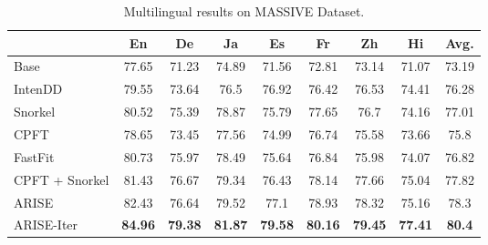 \begin{table*}[!h]
\centering
\begin{tabular}{|l|c|c|c|c|c|c|c|c|}
\hline
           & \textbf{En}                  & \textbf{De}                  & \textbf{Ja}                  & \textbf{Es}                  & \textbf{Fr}                  & \textbf{Zh}                  & \textbf{Hi}                  & \textbf{Avg.} \\ \hline
Base       & 77.65                        & 71.23                        & 74.89                        & 71.56                        & 72.81                        & 73.14                        & 71.07                        & 73.19            \\ \hline
IntenDD    & 79.55                        & {\color[HTML]{565869} 73.64} & {\color[HTML]{565869} 76.5}  & {\color[HTML]{565869} 76.92} & {\color[HTML]{565869} 76.42} & {\color[HTML]{565869} 76.53} & {\color[HTML]{565869} 74.41} & 76.28            \\ \hline
Snorkel    & {\color[HTML]{565869} 80.52} & {\color[HTML]{565869} 75.39} & {\color[HTML]{565869} 78.87} & {\color[HTML]{565869} 75.79} & {\color[HTML]{565869} 77.65} & {\color[HTML]{565869} 76.7}  & {\color[HTML]{565869} 74.16} & 77.01            \\ \hline
CPFT     & 78.65                        & {\color[HTML]{565869} 73.45} & {\color[HTML]{565869} 77.56} & {\color[HTML]{565869} 74.99} & {\color[HTML]{565869} 76.74} & {\color[HTML]{565869} 75.58} & {\color[HTML]{565869} 73.66} & 75.8             \\ \hline
FastFit    & 80.73                        & 75.97                        & 78.49                        & 75.64                        & 76.84                        & 75.98                        & 74.07                        & 76.82            \\ \hline
CPFT + Snorkel    & 81.43 &	76.67	&79.34&	76.43	& 78.14 &	77.66 &	75.04 &	77.82         \\ \hline
ARISE      & 82.43                        & 76.64                        & 79.52                        & 77.1                         & 78.93                        & 78.32                        & 75.16                        & 78.3             \\ \hline
ARISE-Iter & \textbf{84.96}               & \textbf{79.38}               & \textbf{81.87}               & \textbf{79.58}               & \textbf{80.16}               & \textbf{79.45}               & \textbf{77.41}               & \textbf{80.4}    \\ \hline
\end{tabular}
\caption{Multilingual results on MASSIVE Dataset.}
\label{tab:multilingual}
\end{table*}

